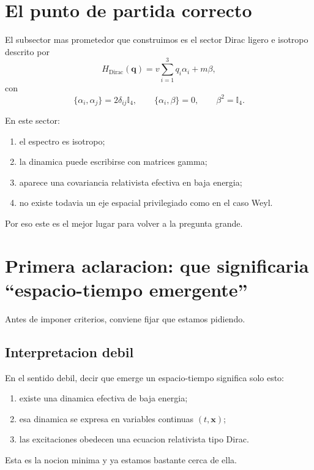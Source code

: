 \section{El punto de partida correcto}
El subsector mas prometedor que construimos es el sector Dirac ligero e isotropo descrito por
\begin{equation}
H_{\text{Dirac}}(\bm{q})=
v\sum_{i=1}^3 q_i \alpha_i + m\beta,
\label{c18:eq:HDirac}
\end{equation}
con
\begin{equation}
\{\alpha_i,\alpha_j\}=2\delta_{ij}\mathbb{I}_4,
\qquad
\{\alpha_i,\beta\}=0,
\qquad
\beta^2=\mathbb{I}_4.
\end{equation}

En este sector:
\begin{enumerate}[label=\arabic*.]
    \item el espectro es isotropo;
    \item la dinamica puede escribirse con matrices gamma;
    \item aparece una covariancia relativista efectiva en baja energia;
    \item no existe todavia un eje espacial privilegiado como en el caso Weyl.
\end{enumerate}

Por eso este es el mejor lugar para volver a la pregunta grande.

\section{Primera aclaracion: que significaria \enquote{espacio-tiempo emergente}}
Antes de imponer criterios, conviene fijar que estamos pidiendo.

\subsection{Interpretacion debil}
En el sentido debil, decir que emerge un espacio-tiempo significa solo esto:
\begin{enumerate}[label=\arabic*.]
    \item existe una dinamica efectiva de baja energia;
    \item esa dinamica se expresa en variables continuas \((t,\bm{x})\);
    \item las excitaciones obedecen una ecuacion relativista tipo Dirac.
\end{enumerate}

Esta es la nocion minima y ya estamos bastante cerca de ella.

